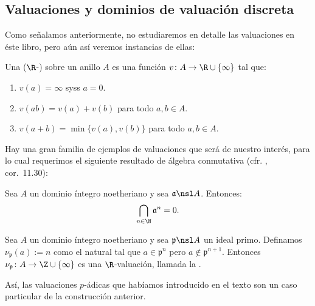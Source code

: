 \documentclass[teoria-numeros.tex]{subfiles}
\begin{document}


\subsection{Valuaciones y dominios de valuación discreta}
Como señalamos anteriormente, no estudiaremos en detalle las valuaciones en éste libro, pero aún así veremos instancias de ellas:
\begin{mydef}
	Una ($\R$-) sobre un anillo $A$ es una función $v\colon A \to \R\cup\{ \infty \}$ tal que:
	\begin{enumerate}[{V}1.]
		\item $v(a) = \infty$ syss $a = 0$.
		\item $v(ab) = v(a) + v(b)$ para todo $a, b\in A$.
		\item $v(a + b) = \min\{ v(a), v(b) \}$ para todo $a, b\in A$.
	\end{enumerate}
\end{mydef}

Hay una gran familia de ejemplos de valuaciones que será de nuestro interés, para lo cual requerimos el siguiente resultado de álgebra conmutativa
(cfr. \cite{Alg}, cor.~11.30):
\begin{thm}
	Sea $A$ un dominio íntegro noetheriano y sea $\mathfrak{a} \nsl A$. Entonces:
	$$ \bigcap_{n\in\N} \mathfrak{a}^n = 0. $$
\end{thm}

\begin{prop}
	Sea $A$ un dominio íntegro noetheriano y sea $\mathfrak{p} \nsl A$ un ideal primo.
	Definamos $\nu_{\mathfrak{p}}(a) := n$ como el natural tal que $a \in \mathfrak{p}^n$ pero $a \notin \mathfrak{p}^{n+1}$.
	Entonces $\nu_{\mathfrak{p}}\colon A \to \Z\cup\{ \infty \}$ es una $\R$-valuación,
	llamada la .
\end{prop}
Así, las valuaciones $p$-ádicas que habíamos introducido en el texto son un caso particular de la construcción anterior.
\end{document}
